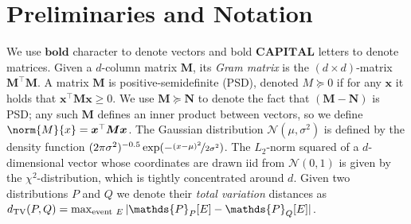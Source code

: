 \documentclass{article}
\renewcommand{\vec}[1]{\bm{#1}}
\renewcommand{\Pr}{\mathds{P}}
\providecommand\transp{\top}
\let\transpsymbol\transp
\renewcommand{\transp}[1]{#1^\transpsymbol}
\newcommand{\Normal}{\mathcal{N}}
\begin{document}
\section{Preliminaries and Notation}
\label{sec:preliminaries}

We use $\vec{bold}$ character to denote vectors and bold
$\vec{CAPITAL}$ letters to denote matrices. 
Given a $d$-column matrix
$\vec M$, its \emph{Gram matrix} is the $(d\times d)$-matrix
$\transp{\vec M}\vec M$.  A matrix $\vec M$ is positive-semidefinite
(PSD), denoted $M\succeq 0$ if for any $\vec x$ it holds that
$\transp{\vec x} \vec M \vec x \geq 0$.  We use $\vec M\succeq \vec N$
to denote the fact that $(\vec M-\vec N)$ is PSD; any such $\vec M$
defines an inner product between vectors, so we define
$\norm{M}{x} = \transp{\vec x} \vec M \vec x$.  The
Gaussian distribution $\Normal(\mu,\sigma^2)$ is defined by the density
function
$(2\pi\sigma^2)^{-0.5}\exp(-\nicefrac{(x-\mu)^2}{2\sigma^2})$. The
$L_2$-norm squared of a $d$-dimensional vector whose coordinates are
drawn iid from $\Normal(0,1)$ is given by the $\chi^2$-distribution,
which is tightly concentrated around $d$. Given two distributions $P$
and $Q$ we denote their \emph{total variation} distances as
$d_{\rm TV}(P,Q) = \max_{{\rm
    event}~E}|\Pr_P[E]-\Pr_Q[E]|$.  %
\end{document}
